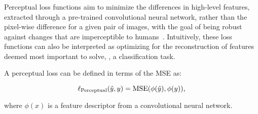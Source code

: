 \subsubsection{\label{section:perceptual-loss}}

Perceptual loss functions aim to minimize the differences in high-level features, extracted through a pre-trained convolutional neural network, rather than the pixel-wise difference for a given pair of images, with the goal of being robust against changes that are imperceptible to humans~\cite{johnson2016perceptual}. Intuitively, these loss functions can also be interpreted as optimizing for the reconstruction of features deemed most important to solve, \eg, a classification task.

A perceptual loss can be defined in terms of the MSE as:

\begin{equation}
  \ell_{\text{Perceptual}}(\hat{y}, y) = \operatorname{MSE}(\phi(\hat{y}), \phi(y)) \text{,}
\end{equation}

\noindent where $\phi(x)$ is a feature descriptor from a convolutional neural network.